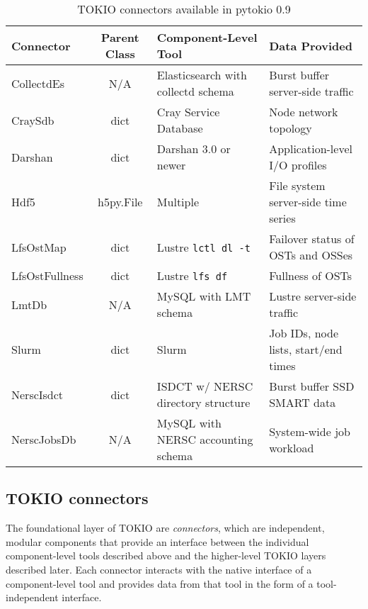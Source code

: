 \begin{table*}[tbp]
\centering
\caption{TOKIO connectors available in pytokio 0.9}
\label{tab:connectors}
\begin{tabular}{|l|c|l|l|}
\hline
\textbf{Connector} & \textbf{Parent Class} & \textbf{Component-Level Tool}      & \textbf{Data Provided}               \\ \hline
CollectdEs         & N/A                   & Elasticsearch with collectd schema & Burst buffer server-side traffic     \\ \hline
CraySdb            & dict                  & Cray Service Database              & Node network topology                \\ \hline
Darshan            & dict                  & Darshan 3.0 or newer               & Application-level I/O profiles       \\ \hline
Hdf5               & h5py.File             & Multiple                           & File system server-side time series  \\ \hline
LfsOstMap          & dict                  & Lustre \texttt{lctl dl -t}         & Failover status of OSTs and OSSes    \\ \hline
LfsOstFullness     & dict                  & Lustre \texttt{lfs df}             & Fullness of OSTs                     \\ \hline
LmtDb              & N/A                   & MySQL with LMT schema              & Lustre server-side traffic           \\ \hline
Slurm              & dict                  & Slurm                              & Job IDs, node lists, start/end times \\ \hline
NerscIsdct         & dict                  & ISDCT w/ NERSC directory structure & Burst buffer SSD SMART data          \\ \hline
NerscJobsDb        & N/A                   & MySQL with NERSC accounting schema & System-wide job workload             \\ \hline
\end{tabular}
\end{table*}

\subsection{TOKIO connectors} \label{sec:architecture/connectors}

The foundational layer of TOKIO are \emph{connectors}, which are independent, modular components that provide an interface between the individual component-level tools described above and the higher-level TOKIO layers described later.
Each connector interacts with the native interface of a component-level tool and provides data from that tool in the form of a tool-independent interface.


